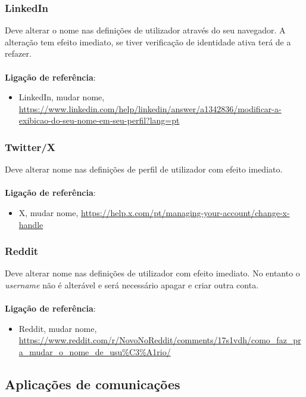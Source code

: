 \subsubsection{LinkedIn}

Deve alterar o nome nas definições de utilizador através do seu
navegador. A alteração tem efeito imediato, se tiver verificação de
identidade ativa terá de a refazer. \\
\\
\textbf{Ligação de referência}:
\begin{itemize}
	\item LinkedIn, mudar nome, \url{https://www.linkedin.com/help/linkedin/answer/a1342836/modificar-a-exibicao-do-seu-nome-em-seu-perfil?lang=pt}
\end{itemize}

\subsubsection{Twitter/X}

Deve alterar nome nas definições de perfil de utilizador com efeito
imediato. \\
\\
\textbf{Ligação de referência}:
\begin{itemize}
	\item X, mudar nome, \url{https://help.x.com/pt/managing-your-account/change-x-handle}
\end{itemize}

\subsubsection{Reddit}

Deve alterar nome nas definições de utilizador com efeito imediato. No
entanto o \emph{username} não é alterável e será necessário apagar e
criar outra conta. \\
\\
\textbf{Ligação de referência}:
\begin{itemize}
	\item Reddit, mudar nome, \url{https://www.reddit.com/r/NovoNoReddit/comments/17s1vdh/como\_faz\_pra\_mudar\_o\_nome\_de\_usu\%C3\%A1rio/}
\end{itemize}

\subsection{Aplicações de comunicações}

